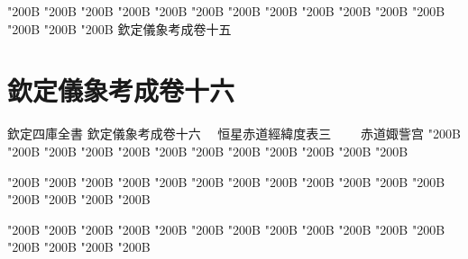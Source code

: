 \begin{正文}
\char"200B\relax{}
\char"200B\relax{}
\char"200B\relax{}
\char"200B\relax{}
\char"200B\relax{}
\char"200B\relax{}
\char"200B\relax{}
\char"200B\relax{}
\char"200B\relax{}
\char"200B\relax{}
\char"200B\relax{}
\char"200B\relax{}
\char"200B\relax{}
\char"200B\relax{}
\char"200B\relax{}
欽定儀象考成卷十五
\par

\par\end{正文}\clearpage
\chapter*{欽定儀象考成卷十六}
\begin{正文}
欽定四庫全書
欽定儀象考成卷十六
　恒星赤道經緯度表三
　　赤道娵訾宫
\char"200B\relax{}
\char"200B\relax{}
\char"200B\relax{}
\char"200B\relax{}
\char"200B\relax{}
\char"200B\relax{}
\char"200B\relax{}
\char"200B\relax{}
\char"200B\relax{}
\char"200B\relax{}
\char"200B\relax{}
\char"200B\relax
\par
\end{正文}\clearpage
{}
\begin{正文}
\char"200B\relax{}
\char"200B\relax{}
\char"200B\relax{}
\char"200B\relax{}
\char"200B\relax{}
\char"200B\relax{}
\char"200B\relax{}
\char"200B\relax{}
\char"200B\relax{}
\char"200B\relax{}
\char"200B\relax{}
\char"200B\relax{}
\char"200B\relax{}
\char"200B\relax{}
\char"200B\relax{}
\char"200B\relax
{}\par
\end{正文}\clearpage
{}
\begin{正文}
\char"200B\relax{}
\char"200B\relax{}
\char"200B\relax{}
\char"200B\relax{}
\char"200B\relax{}
\char"200B\relax{}
\char"200B\relax{}
\char"200B\relax{}
\char"200B\relax{}
\char"200B\relax{}
\char"200B\relax{}
\char"200B\relax{}
\char"200B\relax{}
\char"200B\relax{}
\char"200B\relax{}
\char"200B\relax
{}\par
\end{正文}\clearpage
